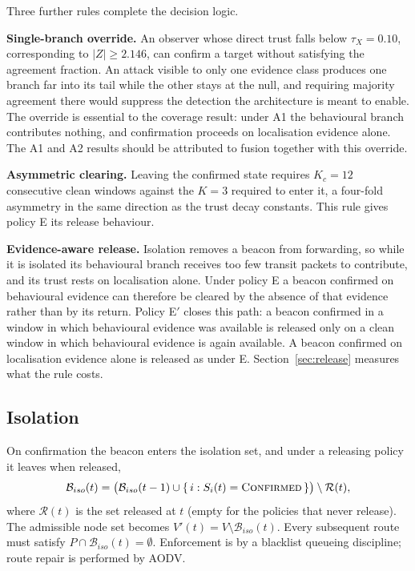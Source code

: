 Three further rules complete the decision logic.

\textbf{Single-branch override.} An observer whose direct trust falls below
$\tau_X = 0.10$, corresponding to $|Z| \ge 2.146$, can confirm a target without
satisfying the agreement fraction. An attack visible to only one evidence class
produces one branch far into its tail while the other stays at the null, and
requiring majority agreement there would suppress the detection the
architecture is meant to enable. The override is essential to the coverage
result: under A1 the behavioural branch contributes nothing, and confirmation
proceeds on localisation evidence alone. The A1 and A2 results should be
attributed to fusion together with this override.

\textbf{Asymmetric clearing.} Leaving the confirmed state requires $K_c = 12$
consecutive clean windows against the $K = 3$ required to enter it, a four-fold
asymmetry in the same direction as the trust decay constants. This rule gives
policy E its release behaviour.

\textbf{Evidence-aware release.} Isolation removes a beacon from forwarding, so
while it is isolated its behavioural branch receives too few transit packets
to contribute, and its trust rests on localisation alone. Under policy E a
beacon confirmed on behavioural evidence can therefore be cleared by the
absence of that evidence rather than by its return. Policy E$'$ closes this
path: a beacon confirmed in a window in which behavioural evidence was
available is released only on a clean window in which behavioural evidence is
again available. A beacon confirmed on localisation evidence alone is released
as under E. Section~\ref{sec:release} measures what the rule costs.

\subsection{Isolation}

On confirmation the beacon enters the isolation set, and under a releasing
policy it leaves when released,
\begin{equation}
\label{eq:iso}
\mathcal{B}_{iso}(t) = \bigl(\mathcal{B}_{iso}(t-1) \cup \{\, i : S_i(t) = \textsc{Confirmed} \,\}\bigr)
\setminus \mathcal{R}(t),
\end{equation}
where $\mathcal{R}(t)$ is the set released at $t$ (empty for the policies
that never release). The admissible node set becomes $V'(t) = V \setminus \mathcal{B}_{iso}(t)$.
Every subsequent route must satisfy $P \cap \mathcal{B}_{iso}(t) = \emptyset$.
Enforcement is by a blacklist queueing discipline; route repair is performed by
AODV.

